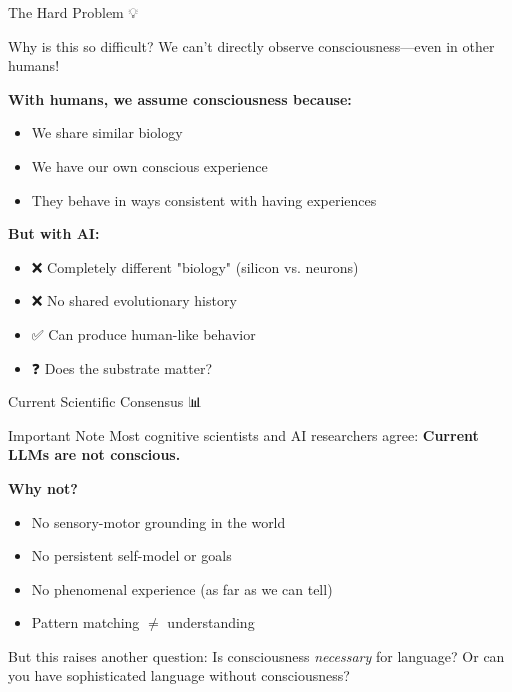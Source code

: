 \documentclass[aspectratio=169]{beamer}
\begin{document}
\begin{frame}[shrink=10]{The Hard Problem 💡}
\small
\begin{block}{Why is this so difficult?}
We can't directly observe consciousness—even in other humans!
\end{block}

\vspace{0.3cm}

\textbf{With humans, we assume consciousness because:}
\begin{itemize}\setlength{\itemsep}{0pt}
    \item We share similar biology
    \item We have our own conscious experience
    \item They behave in ways consistent with having experiences
\end{itemize}

\vspace{0.3cm}

\textbf{But with AI:}
\begin{itemize}\setlength{\itemsep}{0pt}
    \item ❌ Completely different "biology" (silicon vs. neurons)
    \item ❌ No shared evolutionary history
    \item ✅ Can produce human-like behavior
    \item ❓ Does the substrate matter?
\end{itemize}
\end{frame}

\begin{frame}{Current Scientific Consensus 📊}
\small
\begin{alertblock}{Important Note}
Most cognitive scientists and AI researchers agree: \textbf{Current LLMs are not conscious.}
\end{alertblock}

\vspace{0.3cm}

\textbf{Why not?}
\begin{itemize}\setlength{\itemsep}{0pt}
    \item No sensory-motor grounding in the world
    \item No persistent self-model or goals
    \item No phenomenal experience (as far as we can tell)
    \item Pattern matching $\neq$ understanding
\end{itemize}

\vspace{0.3cm}

\begin{thinkaboutit}
But this raises another question: Is consciousness \textit{necessary} for language? Or can you have sophisticated language without consciousness?
\end{thinkaboutit}
\end{frame}
\end{document}
